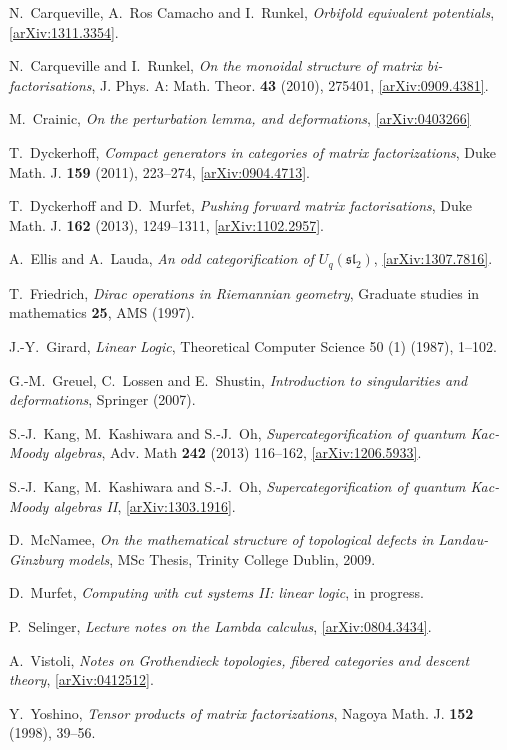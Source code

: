 \documentclass[english,letter paper,12pt,leqno]{article}
\theoremstyle{example}
\numberwithin{equation}{section}
\begin{document}
\begin{thebibliography}{BHLS03}
N.~Carqueville, A.~Ros Camacho and I.~Runkel, \textsl{Orbifold equivalent potentials}, \href{http://arxiv.org/abs/1311.3354}{[arXiv:1311.3354]}.

N.~Carqueville and I.~Runkel, \textsl{On the monoidal structure of matrix bi-factorisations}, J. Phys.
  A: Math. Theor. \textbf{43} (2010), 275401,
  \href{http://arxiv.org/abs/0909.4381}{[arXiv:0909.4381]}.
  
M.~Crainic, \emph{On the perturbation lemma, and deformations}, \href{http://arxiv.org/abs/math/0403266}{[arXiv:0403266]}

T.~Dyckerhoff, \textsl{Compact generators in categories of matrix factorizations},
  Duke Math. J. \textbf{159} (2011), 223--274,
  \href{http://arxiv.org/abs/0904.4713}{[arXiv:0904.4713]}.

T.~Dyckerhoff and D.~Murfet, \textsl{Pushing forward matrix factorisations}, Duke Math. J. \textbf{162} (2013), 1249--1311, \href{http://arxiv.org/abs/1102.2957}{[arXiv:1102.2957]}.

A.~Ellis and A.~Lauda, \textsl{An odd categorification of $U_q(\mathfrak{sl}_2)$}, \href{http://arxiv.org/abs/1307.7816}{[arXiv:1307.7816]}.

T.~Friedrich, \textsl{{D}irac operations in {R}iemannian geometry}, Graduate studies in mathematics \textbf{25}, AMS (1997).
  
J.-Y.~Girard, \textsl{Linear Logic}, Theoretical Computer Science 50 (1) (1987), 1--102.

G.-M.~Greuel, C.~Lossen and E.~Shustin, \textsl{Introduction to singularities and deformations}, Springer (2007).

S.-J.~Kang, M.~Kashiwara and S.-J.~Oh, \textsl{Supercategorification of quantum Kac-Moody algebras}, Adv. Math \textbf{242} (2013) 116--162, \href{http://arxiv.org/abs/1206.5933}{[arXiv:1206.5933]}.

S.-J.~Kang, M.~Kashiwara and S.-J.~Oh, \textsl{Supercategorification of quantum Kac-Moody algebras II}, \href{http://arxiv.org/abs/1303.1916}{[arXiv:1303.1916]}.

D.~McNamee, \textsl{On the mathematical structure of topological defects in
  {L}andau-{G}inzburg models}, MSc Thesis, Trinity College Dublin, 2009.
  
D.~Murfet, \textsl{Computing with cut systems II: linear logic}, in progress.

P.~Selinger, \textsl{Lecture notes on the {L}ambda calculus}, \href{http://arxiv.org/abs/0804.3434}{[arXiv:0804.3434]}.

A.~Vistoli, \textsl{Notes on {G}rothendieck topologies, fibered categories and descent theory}, \href{http://arxiv.org/abs/math/0412512}{[arXiv:0412512]}.

Y.~Yoshino, \textsl{Tensor products of matrix factorizations}, Nagoya Math. J.
  \textbf{152} (1998), 39--56.
  
\end{thebibliography}
\end{document}
